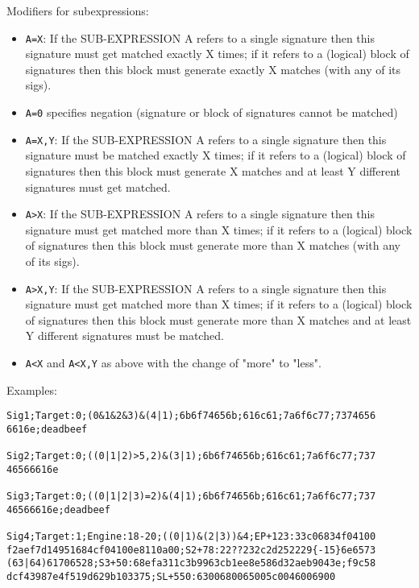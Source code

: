 \documentclass[a4paper,titlepage,12pt]{article}
\begin{document}
    Modifiers for subexpressions:
    \begin{itemize}
	\item \verb+A=X+: If the SUB-EXPRESSION A refers to a single signature
	then this signature must get matched exactly X times; if it refers to
	a (logical) block of signatures then this block must generate exactly
	X matches (with any of its sigs).
	\item \verb+A=0+ specifies negation (signature or block of signatures
	cannot be matched)
	\item \verb+A=X,Y+: If the SUB-EXPRESSION A refers to a single signature
	then this signature must be matched exactly X times; if it refers to
	a (logical) block of signatures then this block must generate X matches
	and at least Y different signatures must get matched.
	\item \verb+A>X+: If the SUB-EXPRESSION A refers to a single signature
	then this signature must get matched more than X times; if it refers to
	a (logical) block of signatures then this block must generate more
	than X matches (with any of its sigs).
	\item \verb+A>X,Y+: If the SUB-EXPRESSION A refers to a single signature
	then this signature must get matched more than X times; if it refers to
	a (logical) block of signatures then this block must generate more than
	X matches and at least Y different signatures must be matched.
	\item \verb+A<X+ and \verb+A<X,Y+ as above with the change of "more"
	to "less".
    \end{itemize}
    Examples:
    \begin{verbatim}
Sig1;Target:0;(0&1&2&3)&(4|1);6b6f74656b;616c61;7a6f6c77;7374656
6616e;deadbeef

Sig2;Target:0;((0|1|2)>5,2)&(3|1);6b6f74656b;616c61;7a6f6c77;737
46566616e

Sig3;Target:0;((0|1|2|3)=2)&(4|1);6b6f74656b;616c61;7a6f6c77;737
46566616e;deadbeef

Sig4;Target:1;Engine:18-20;((0|1)&(2|3))&4;EP+123:33c06834f04100
f2aef7d14951684cf04100e8110a00;S2+78:22??232c2d252229{-15}6e6573
(63|64)61706528;S3+50:68efa311c3b9963cb1ee8e586d32aeb9043e;f9c58
dcf43987e4f519d629b103375;SL+550:6300680065005c0046006900
    \end{verbatim}
\end{document}
